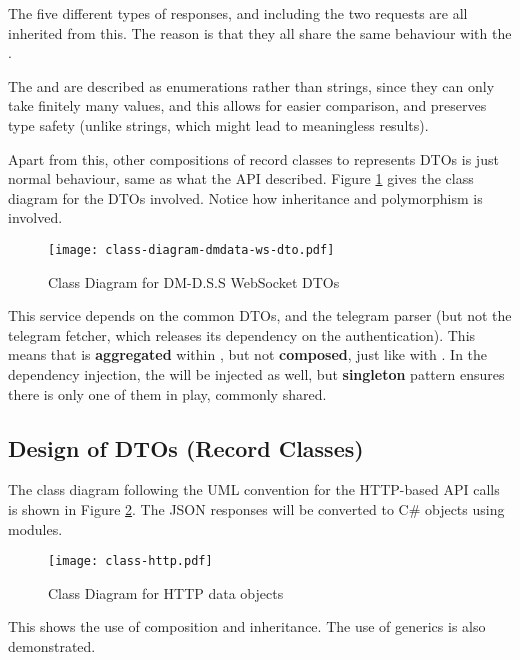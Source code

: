 The five different types of responses, and including the two requests are all inherited from this. The reason is that they all share the same behaviour with the .

The  and  are described as enumerations rather than strings, since they can only take finitely many values, and this allows for easier comparison, and preserves type safety (unlike strings, which might lead to meaningless results).

Apart from this, other compositions of record classes to represents DTOs is just normal behaviour, same as what the API described. Figure \ref{fig:class-diagram-dmdata-ws-dto} gives the class diagram for the DTOs involved. Notice how inheritance and polymorphism is involved.

\begin{figure}[htp]
    \centering
    \texttt{[image: class-diagram-dmdata-ws-dto.pdf]}
    \caption{Class Diagram for DM-D.S.S WebSocket DTOs}
    \label{fig:class-diagram-dmdata-ws-dto}
\end{figure}

This service depends on the common DTOs, and the telegram parser (but not the telegram fetcher, which releases its dependency on the authentication). This means that  is \textbf{aggregated} within , but not \textbf{composed}, just like with . In the dependency injection, the  will be injected as well, but \textbf{singleton} pattern ensures there is only one of them in play, commonly shared.

\subsection{Design of DTOs (Record Classes)}

The class diagram following the UML convention for the HTTP-based API calls is shown in Figure \ref{fig:classes-http}. The JSON responses will be converted to C\# objects using  modules.

\begin{figure}[htp]
    \centering
    \texttt{[image: class-http.pdf]}
    \caption{Class Diagram for HTTP data objects}
    \label{fig:classes-http}
\end{figure}

This shows the use of composition and inheritance. The use of generics is also demonstrated.

